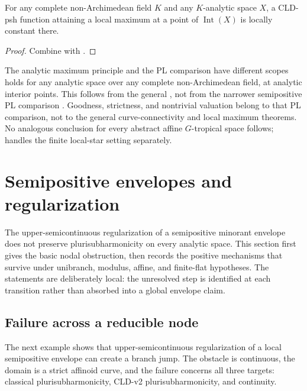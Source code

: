 \begin{corollary}
\label{cor:ch15-cld-curve-max}
For any complete non-Archimedean field $K$ and any $K$-analytic space $X$,
a CLD-psh function attaining a local maximum at a point of
$\operatorname{Int}(X)$ is locally constant there.
\end{corollary}

\begin{proof}
Combine  with .
\end{proof}

\begin{warning}{The analytic maximum principle and the PL comparison have
 different scopes}
 holds for any analytic space over any complete
non-Archimedean field, at analytic interior points.  This follows from the
general \cite[Theorem~6.1]{GR25Classical}, not from the narrower
semipositive PL comparison .  Goodness,
strictness, and nontrivial valuation belong to that PL comparison, not to
the general curve-connectivity and local maximum theorems.  No analogous
conclusion for every abstract affine $G$-tropical space follows;
 handles the finite local-star setting separately.
\end{warning}

\section{Semipositive envelopes and regularization}
\label{sec:ch15-envelopes}

The upper-semicontinuous regularization of a semipositive minorant envelope
does not preserve plurisubharmonicity on every analytic space.  This section
first gives the basic nodal obstruction, then records the positive mechanisms
that survive under unibranch, modulus, affine, and finite-flat hypotheses.
The statements are deliberately local: the unresolved step is identified at
each transition rather than absorbed into a global envelope claim.

\subsection{Failure across a reducible node}
\label{sec:ch15-nodal-envelope}

The next example shows that upper-semicontinuous regularization of a local
semipositive envelope can create a branch jump.  The obstacle is continuous,
the domain is a strict affinoid curve, and the failure concerns all three
targets: classical plurisubharmonicity, CLD-v2 plurisubharmonicity, and
continuity.

